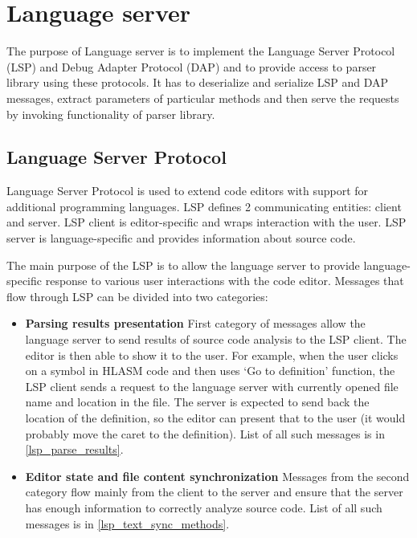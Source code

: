 \chapter{Language server}

The purpose of Language server is to implement the Language Server Protocol (LSP) and Debug Adapter Protocol (DAP) and to provide access to parser library using these protocols. It has to deserialize and serialize LSP and DAP messages, extract parameters of particular methods and then serve the requests by invoking functionality of parser library.

\section{Language Server Protocol}
Language Server Protocol is used to extend code editors with support for additional programming languages. LSP defines 2 communicating entities: client and server. LSP client is editor-specific and wraps interaction with the user. LSP server is language-specific and provides information about source code.

The main purpose of the LSP is to allow the language server to provide language-specific response to various user interactions with the code editor. Messages that flow through LSP can be divided into two categories:

\begin{itemize}
	\item \textbf{Parsing results presentation} First category of messages allow the language server to send results of source code analysis to the LSP client. The editor is then able to show it to the user. For example, when the user clicks on a symbol in HLASM code and then uses `Go to definition' function, the LSP client sends a request to the language server with currently opened file name and location in the file. The server is expected to send back the location of the definition, so the editor can present that to the user (it would probably move the caret to the definition). List of all such messages is in \cref{lsp_parse_results}.

	\item \textbf{Editor state and file content synchronization} Messages from the second category flow mainly from the client to the server and ensure that the server has enough information to correctly analyze source code. List of all such messages is in \cref{lsp_text_sync_methods}.

\end{itemize}



